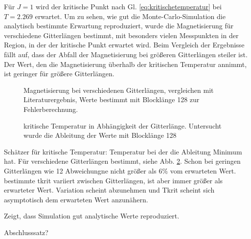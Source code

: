 	Für $J=1$ wird der kritische Punkt nach Gl. \ref{eq:kritischetemperatur} bei $T=\num{2,269}$ erwartet.
	Um zu sehen, wie gut die Monte-Carlo-Simulation die analytisch bestimmte Erwartung reproduziert, wurde die Magnetisierung für verschiedene Gitterlängen bestimmt, mit besonders vielen Messpunkten in der Region, in der der kritische Punkt erwartet wird. Beim Vergleich der Ergebnisse fällt auf, dass der Abfall der Magnetisierung bei größeren Gitterlängen steiler ist. Der Wert, den die Magnetisierung überhalb der kritischen Temperatur annimmt, ist geringer für größere Gitterlängen.
	
	\begin{figure}[htbp]
		
		\caption[Magnetisierung bei verschiedenen Gitterlängen]{Magnetisierung bei verschiedenen Gitterlängen, vergleichen mit Literaturergebnis, Werte bestimmt mit Blocklänge 128 zur Fehlerberechnung.}
		\label{fig:maglaenge}
	\end{figure}
	
	\begin{figure}[htbp]
		
		\caption[kritische Temperatur in Abhängigkeit der Gitterlänge]{kritische Temperatur in Abhängigkeit der Gitterlänge. Untersucht wurde die Ableitung der Werte mit Blocklänge 128}
		\label{fig:tkritlaenge}
	\end{figure}
	
	Schätzer für kritische Temperatur: Temperatur bei der die Ableitung Minimum hat. Für verschiedene Gitterlängen bestimmt, siehe Abb. \ref{fig:tkritlaenge}. Schon bei geringen Gitterlängen wie 12 Abweichungne nicht größer als 6\% vom erwarteten Wert. bestimmte tkrit variiert zwischen Gitterlängen, ist aber immer größer als erwarteter Wert. Variation scheint abzunehmen und Tkrit scheint sich asymptotisch dem erwarteten Wert anzunähern.
	
	Zeigt, dass Simulation gut analytische Werte reproduziert.
	
	Abschlusssatz?
	
